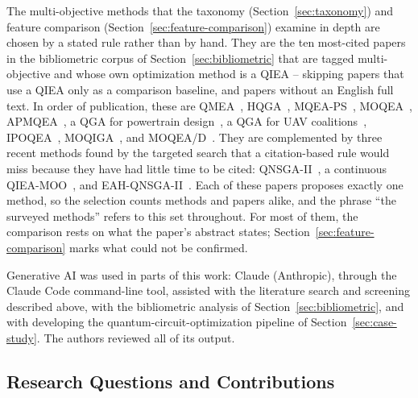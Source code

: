 The multi-objective methods that the taxonomy
(Section~\ref{sec:taxonomy}) and feature comparison
(Section~\ref{sec:feature-comparison}) examine in depth are chosen by a
stated rule rather than by hand. They are the ten most-cited papers in
the bibliometric corpus of Section~\ref{sec:bibliometric} that are
tagged multi-objective and whose own optimization method is a QIEA --
skipping papers that use a QIEA only as a comparison baseline, and
papers without an English full text. In order of publication, these are
QMEA~\citep{kim2006qmea}, HQGA~\citep{li2007hqga},
MQEA-PS~\citep{kim2011mqeaps}, MOQEA~\citep{zhang2012moqeavrp},
APMQEA~\citep{lu2013apmqea}, a QGA for powertrain
design~\citep{wang2014powertrain}, a QGA for UAV
coalitions~\citep{mousavi2019uav}, IPOQEA~\citep{deng2020gate},
MOQIGA~\citep{hussain2022moqiga}, and MOQEA/D~\citep{deng2024moqead}.
They are complemented by three recent methods found by the targeted
search that a citation-based rule would miss because they have had
little time to be cited: QNSGA-II~\citep{guzel2022qnsga2}, a continuous
QIEA-MOO~\citep{olvera2023continuous}, and
EAH-QNSGA-II~\citep{kumar2026eahqnsga2}. Each of these papers proposes
exactly one method, so the selection counts methods and papers alike,
and the phrase ``the surveyed methods'' refers to this set throughout.
For most of them, the comparison rests on
what the paper's abstract states; Section~\ref{sec:feature-comparison}
marks what could not be confirmed.

Generative AI was used in parts of this work: Claude (Anthropic),
through the Claude Code command-line tool, assisted with the literature
search and screening described above, with the bibliometric analysis
of Section~\ref{sec:bibliometric}, and with developing the
quantum-circuit-optimization pipeline of Section~\ref{sec:case-study}.
The authors reviewed all of its output.

\subsection{Research Questions and Contributions}
\label{sec:introduction:contributions}

